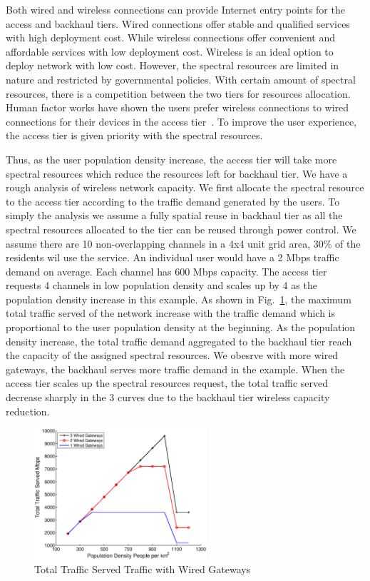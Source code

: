 Both wired and wireless connections can provide Internet entry points for the access and backhaul tiers.
Wired connections offer stable and qualified services with high deployment cost. 
While wireless connections offer convenient and affordable services with low deployment cost. 
Wireless is an ideal option to deploy network with low cost.
However, the spectral resources are limited in nature and restricted by governmental policies. 
With certain amount of spectral resources, there is a competition between the two tiers for resources allocation.
Human factor works have shown the users prefer wireless connections to wired connections for their 
devices in the access tier~\cite{lu2003technology}. To improve the user experience, the access tier is 
given priority with the spectral resources.


Thus, as the user population density increase, the access tier will take more spectral resources which reduce
the resources left for backhaul tier.
We have a rough analysis of wireless network capacity. 
We first allocate the spectral resource to the access 
tier according to the traffic demand generated by the users. 
To simply the analysis we assume a fully spatial reuse in backhaul 
tier as all the spectral resources allocated to the tier can be reused through power control.
We assume there are 10 non-overlapping channels in a 4x4 unit grid area, 30\% of the residents wil use the service. 
An individual user would have a 2 Mbps traffic demand on average. Each channel has 600 Mbps capacity.
The access tier requests 4 channels in low population density and scales up by 4 as the population density increase in 
this example.
As shown in Fig.~\ref{fig:spectral_allocation}, the maximum total traffic served of the network increase with the traffic 
demand which is proportional to the user population density at the beginning. 
As the population density increase, the total traffic demand aggregated to the backhaul tier reach the 
capacity of the assigned spectral resources.
We obesrve with more wired gateways, the backhaul serves more traffic demand in the example.
When the access tier scales up the spectral resources request, 
the total traffic served decrease sharply in the 3 curves due to the backhaul tier wireless capacity reduction.

\begin{figure}
\vspace{-0.0in}
\centering
\includegraphics[width=64mm]{figures/spectral_allocation}
\vspace{-0.1in}
\caption{Total Traffic Served Traffic with Wired Gateways}
\label{fig:spectral_allocation}
\vspace{-0.3in}
\end{figure}

